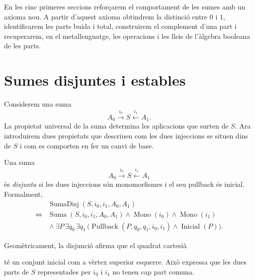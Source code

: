 En les cinc primeres seccions reforçarem el comportament de les sumes amb
un axioma nou. A partir d'aquest axioma obtindrem la distinció entre
\(0\) i \(1\), identificarem les parts buida i total, construirem el
complement d'una part i recuperarem, en el metallenguatge, les operacions
i les lleis de l'àlgebra booleana de les parts.

\section{Sumes disjuntes i estables}\label{sec:sumes-disjuntes}

Considerem una suma
\[
A_0\xrightarrow{i_0}S\xleftarrow{i_1}A_1.
\]
La propietat universal de la suma determina les aplicacions que surten de
\(S\). Ara introduirem dues propietats que descriuen com les dues
injeccions se situen dins de \(S\) i com es comporten en fer
un canvi de base.

\begin{definicio}\label{def:suma-disjunta}
Una suma
\[
A_0\xrightarrow{i_0}S\xleftarrow{i_1}A_1
\]
és \emph{disjunta} si les dues injeccions són
monomorfismes i el seu pullback és inicial. Formalment,
\[
\begin{aligned}
&\operatorname{SumaDisj}(S,i_0,i_1,A_0,A_1)
\\
\iff{}&
\operatorname{Suma}(S,i_0,i_1,A_0,A_1)
\land\operatorname{Mono}(i_0)
\land\operatorname{Mono}(i_1)
\\
&{}\land
\exists P\,\exists q_0\,\exists q_1\,
\bigl(
\operatorname{Pullback}(P,q_0,q_1,i_0,i_1)
\land\operatorname{Inicial}(P)
\bigr).
\end{aligned}
\]
\end{definicio}

Geomètricament, la disjunció afirma que el quadrat cartesià
\begin{center}
\end{center}
té un conjunt inicial com a vèrtex superior esquerre. Això expressa que
les dues parts de \(S\) representades per \(i_0\) i \(i_1\) no tenen
cap part comuna.

